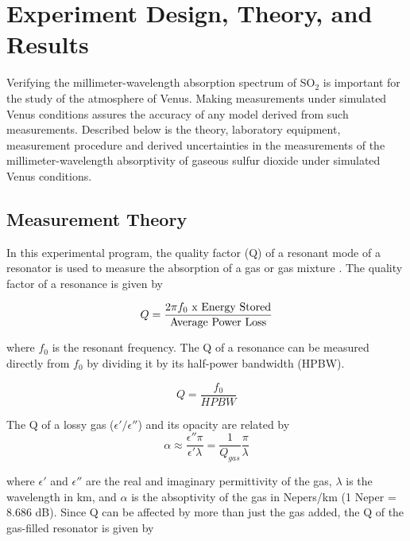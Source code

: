\chapter{Experiment Design, Theory, and Results}

Verifying the millimeter-wavelength absorption spectrum of SO$_2$ is important for the study of the atmosphere of Venus. Making measurements under simulated Venus conditions assures the accuracy of any model derived from such measurements.
 Described below is the theory, laboratory equipment, measurement procedure and derived uncertainties in the measurements of the millimeter-wavelength absorptivity of gaseous sulfur dioxide under simulated Venus conditions.

\section{Measurement Theory}

In this experimental program, the quality factor (Q) of a resonant mode of a resonator is used to measure the absorption of a gas or gas mixture \cite{Hanley-2007}. The quality factor of a resonance is given by \cite{Matthael-1980}

\begin{equation} \label{eq:qlong}
Q = \frac{2\pi f_0 \textnormal{ x Energy Stored}}{\textnormal{Average Power Loss}}
\end{equation}

\noindent where $f_0$ is the resonant frequency. The Q of a resonance can be measured directly from $f_0$ by dividing it by its half-power bandwidth (HPBW).

\begin{equation} \label{eq:qshort}
Q = \frac{f_0}{HPBW}
\end{equation}

\noindent The Q of a lossy gas ($\epsilon'/\epsilon''$) and its opacity are related by
\begin{equation} \label{eq:alphaapprox}
\alpha \approx \frac{\epsilon'' \pi}{\epsilon' \lambda} = \frac{1}{Q_{gas}} \frac{\pi}{\lambda}
\end{equation}

\noindent where $\epsilon'$ and $\epsilon''$ are the real and imaginary permittivity of the gas, $\lambda$ is the wavelength in km, and $\alpha$ is the absoptivity of the gas in Nepers/km (1 Neper = 8.686 dB). Since Q can be affected by more than just the gas added, the Q of the gas-filled resonator is given by

